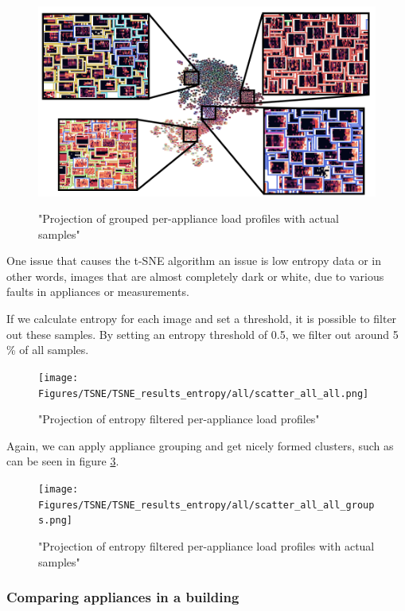 \begin{figure}[H]
	\centering
	\caption{"Projection of grouped per-appliance load profiles with actual samples"}
	\includegraphics[width=.9\textwidth]{Figures/TSNE/TSNE_results/all/t-sne_zoomed.png}
	\label{fig:t-sne_zoomed}
\end{figure}

One issue that causes the t-SNE algorithm an issue is low entropy data or 
in other words, images that are almost completely dark or white, due to various faults in appliances or measurements.

If we calculate entropy for each image and set a threshold, it is possible to filter out these samples. 
By setting an entropy threshold of 0.5, we filter out around 5 \% of all samples. 

\begin{figure}[H]
	\centering
	\caption{"Projection of entropy filtered per-appliance load profiles"}
	\texttt{[image: Figures/TSNE/TSNE\_results\_entropy/all/scatter\_all\_all.png]}
	\label{fig:tsne_papb_scatter_ent_all_groups}
\end{figure}

Again, we can apply appliance grouping and get nicely formed clusters, such as can be seen in figure \ref{fig:tsne_papb_img_scatter_ent_all_groups}.

\begin{figure}[H]
	\centering
	\caption{"Projection of entropy filtered per-appliance load profiles with actual samples"}
	\texttt{[image: Figures/TSNE/TSNE\_results\_entropy/all/scatter\_all\_all\_groups.png]}
	\label{fig:tsne_papb_img_scatter_ent_all_groups}
\end{figure}


\subsubsection{Comparing appliances in a building}

